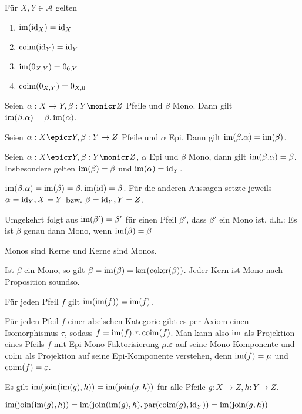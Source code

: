 \begin{prop}
Für $X,Y \in \mathcal A$ gelten
\begin{enumerate}
\item $\operatorname{im}(\operatorname{id}_X) = \operatorname{id}_X$
\item $\operatorname{coim}(\operatorname{id}_Y) = \operatorname{id}_Y$
\item $\operatorname{im}(0_{X,Y}) = 0_{0,Y}$
\item $\operatorname{coim}(0_{X,Y}) = 0_{X,0}$
\end{enumerate}
\end{prop}


\begin{prop}
Seien $\alpha : X \to Y, \beta : Y \monicr Z$ Pfeile und $\beta$ Mono.
Dann gilt $\operatorname{im}(\beta.\alpha) = \beta.\operatorname{im}(\alpha)$.
\end{prop}


\begin{prop}
Seien $\alpha : X \epicr Y, \beta : Y \to Z$ Pfeile und $\alpha$ Epi.
Dann gilt $\operatorname{im}(\beta.\alpha) = \operatorname{im}(\beta)$.
\end{prop}

\begin{korr}
Seien $\alpha : X \epicr Y, \beta : Y \monicr Z$, $\alpha$ Epi und $\beta$ Mono, dann gilt $\operatorname{im}(\beta.\alpha) = \beta$. Insbesondere gelten $\operatorname{im}(\beta) = \beta$ und $\operatorname{im}(\alpha) = \operatorname{id}_Y$.
\end{korr}
\begin{bew}
$\operatorname{im}(\beta.\alpha) = \operatorname{im}(\beta) = \beta.\operatorname{im}(\operatorname{id}) = \beta$. Für die anderen Aussagen setzte jeweils $\alpha = \operatorname{id}_Y, X=Y$ bzw. $\beta = \operatorname{id}_Y, Y=Z$.
\end{bew}
\begin{bem}
Umgekehrt folgt aus $\operatorname{im}(\beta') = \beta'$ für einen Pfeil $\beta'$, dass $\beta'$ ein Mono ist, d.h.:
Es ist $\beta$ genau dann Mono, wenn $\operatorname{im}(\beta) = \beta$
\end{bem}

\begin{korr}
Monos sind Kerne und Kerne sind Monos.
\end{korr}
\begin{bew}
Ist $\beta$ ein Mono, so gilt $\beta = \operatorname{im}(\beta) = \ker(\operatorname{coker}(\beta))$.
Jeder Kern ist Mono nach Proposition soundso.
\end{bew}

\begin{korr}
Für jeden Pfeil $f$ gilt $\operatorname{im}(\operatorname{im}(f)) = \operatorname{im}(f)$.
\end{korr}

\begin{bem}
Für jeden Pfeil $f$ einer abelschen Kategorie gibt es per Axiom einen Isomorphismus $\tau$, sodass $f = \operatorname{im}(f).\tau.\operatorname{coim}(f)$.
Man kann also $\operatorname{im}$ als Projektion eines Pfeils $f$ mit Epi-Mono-Faktorisierung $\mu.\varepsilon$ auf seine Mono-Komponente und $\operatorname{coim}$ als Projektion auf seine Epi-Komponente verstehen, denn $\operatorname{im}(f) = \mu$ und $\operatorname{coim}(f) = \varepsilon$.

\end{bem}

\begin{prop} \label{im-join-im-elim}
Es gilt $\operatorname{im}(\operatorname{join}(\operatorname{im}(g),h)) = \operatorname{im}(\operatorname{join}(g,h))$ für alle Pfeile $g:X\to Z,h : Y\to Z$.
\end{prop}
\begin{bew}
$\operatorname{im}(\operatorname{join}(\operatorname{im}(g),h)) = \operatorname{im}(\operatorname{join}(\operatorname{im}(g),h).\operatorname{par}(\operatorname{coim}(g),\operatorname{id}_Y)) = \operatorname{im}(\operatorname{join}(g,h))$
\end{bew}
